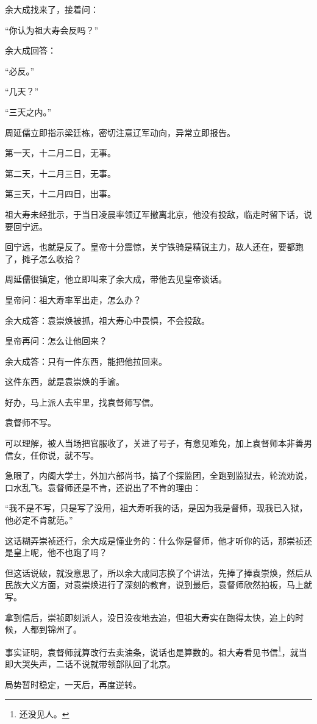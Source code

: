 \begin{multicols}{\theparacolNo}
余大成找来了，接着问：

“你认为祖大寿会反吗？”

余大成回答：

“必反。”

“几天？”

“三天之内。”

周延儒立即指示梁廷栋，密切注意辽军动向，异常立即报告。

第一天，十二月二日，无事。

第二天，十二月三日，无事。

第三天，十二月四日，出事。

祖大寿未经批示，于当日凌晨率领辽军撤离北京，他没有投敌，临走时留下话，说要回宁远。

回宁远，也就是反了。皇帝十分震惊，关宁铁骑是精锐主力，敌人还在，要都跑了，摊子怎么收拾？

周延儒很镇定，他立即叫来了余大成，带他去见皇帝谈话。

皇帝问：祖大寿率军出走，怎么办？

余大成答：袁崇焕被抓，祖大寿心中畏惧，不会投敌。

皇帝再问：怎么让他回来？

余大成答：只有一件东西，能把他拉回来。

这件东西，就是袁崇焕的手谕。

好办，马上派人去牢里，找袁督师写信。

袁督师不写。

可以理解，被人当场把官服收了，关进了号子，有意见难免，加上袁督师本非善男信女，任你说，就不写。

急眼了，内阁大学士，外加六部尚书，搞了个探监团，全跑到监狱去，轮流劝说，口水乱飞。袁督师还是不肯，还说出了不肯的理由：

“我不是不写，只是写了没用，祖大寿听我的话，是因为我是督师，现我已入狱，他必定不肯就范。”

这话糊弄崇祯还行，余大成是懂业务的：什么你是督师，他才听你的话，那崇祯还是皇上呢，他不也跑了吗？

但这话说破，就没意思了，所以余大成同志换了个讲法，先捧了捧袁崇焕，然后从民族大义方面，对袁崇焕进行了深刻的教育，说到最后，袁督师欣然拍板，马上就写。

拿到信后，崇祯即刻派人，没日没夜地去追，但祖大寿实在跑得太快，追上的时候，人都到锦州了。

事实证明，袁督师就算改行去卖油条，说话也是算数的。祖大寿看见书信\footnote{还没见人。}，就当即大哭失声，二话不说就带领部队回了北京。

局势暂时稳定，一天后，再度逆转。


\end{multicols}

